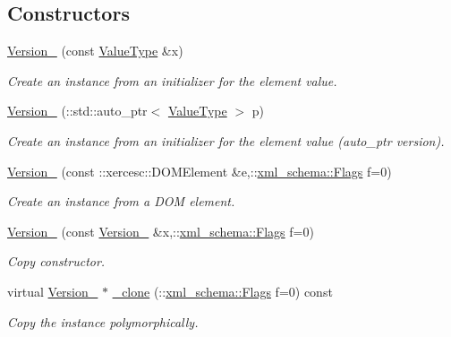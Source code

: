 \subsection*{Constructors}
\begin{DoxyCompactItemize}
\item 
\hyperlink{classopenstack_1_1xml_1_1Version___a486c38efb9b436095d74aa6eaf383dc0}{Version\_\-} (const \hyperlink{classopenstack_1_1xml_1_1Version}{ValueType} \&x)
\begin{DoxyCompactList}\small\item\em Create an instance from an initializer for the element value. \item\end{DoxyCompactList}\item 
\hyperlink{classopenstack_1_1xml_1_1Version___a8251541b054216d39f3cec0834dc1df0}{Version\_\-} (::std::auto\_\-ptr$<$ \hyperlink{classopenstack_1_1xml_1_1Version}{ValueType} $>$ p)
\begin{DoxyCompactList}\small\item\em Create an instance from an initializer for the element value (auto\_\-ptr version). \item\end{DoxyCompactList}\item 
\hyperlink{classopenstack_1_1xml_1_1Version___a7f0ea99436d86940c1630cc0e34b553c}{Version\_\-} (const ::xercesc::DOMElement \&e,::\hyperlink{namespacexml__schema_affb4c227cbd9aa7453dd1dc5a1401943}{xml\_\-schema::Flags} f=0)
\begin{DoxyCompactList}\small\item\em Create an instance from a DOM element. \item\end{DoxyCompactList}\item 
\hyperlink{classopenstack_1_1xml_1_1Version___a49244e4ed2c98d2d3ed77df7173cc285}{Version\_\-} (const \hyperlink{classopenstack_1_1xml_1_1Version__}{Version\_\-} \&x,::\hyperlink{namespacexml__schema_affb4c227cbd9aa7453dd1dc5a1401943}{xml\_\-schema::Flags} f=0)
\begin{DoxyCompactList}\small\item\em Copy constructor. \item\end{DoxyCompactList}\item 
virtual \hyperlink{classopenstack_1_1xml_1_1Version__}{Version\_\-} $\ast$ \hyperlink{classopenstack_1_1xml_1_1Version___aa57215ab0952eeb2a971dff16be6833a}{\_\-clone} (::\hyperlink{namespacexml__schema_affb4c227cbd9aa7453dd1dc5a1401943}{xml\_\-schema::Flags} f=0) const 
\begin{DoxyCompactList}\small\item\em Copy the instance polymorphically. \item\end{DoxyCompactList}\end{DoxyCompactItemize}
